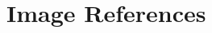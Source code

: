 
\setcounter{secnumdepth}{0} %
\section{Image References}
\label{sec:image_references}

\footnotesize
\sloppy

